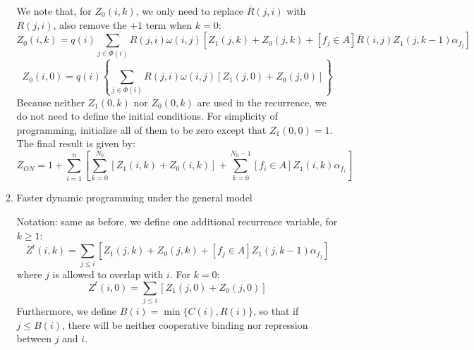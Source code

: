 \documentclass[11pt]{article}
\begin{document}
\begin{enumerate}
\begin{enumerate}
We note that, for $Z_0(i,k)$, we only need to replace $\bar{R}(j,i)$ with $R(j,i)$, also remove the $+1$ term when $k = 0$: 
\begin{equation}
Z_0(i,k) = q(i) \sum_{j \in \Phi(i)} {R}(j,i) \omega(i,j) \left[ Z_1(j,k) + Z_0(j,k) + [f_j \in A] \bar{R}(i,j) Z_1(j,k-1) \alpha_{f_j} \right]
\end{equation}
\begin{equation}
Z_0(i,0) = q(i) \left\{ \sum_{j \in \Phi(i)} {R}(j,i) \omega(i,j) \left[ Z_1(j,0) + Z_0(j,0) \right] \right\}
\end{equation}
Because neither $Z_1(0,k)$ nor $Z_0(0,k)$ are used in the recurrence, we do not need to define the initial conditions. For simplicity of programming, initialize all of them to be zero except that $Z_1(0,0) = 1$. The final result is given by: 
\begin{equation}
Z_{ON} = 1 + \sum_{i = 1}^{n} \left[ \sum_{k=0}^{N_0} [Z_1(i,k) + Z_0(i,k)] + \sum_{k=0}^{N_0-1} [f_i \in A] Z_1(i,k) \alpha_{f_i} \right]
\end{equation}

\item{Faster dynamic programming under the general model}

Notation: same as before, we define one additional recurrence variable, for $k \geq 1$: 
\begin{equation}
Z^t(i,k) = \sum_{j \leq i} \left[ Z_1(j,k) + Z_0(j,k) + [f_j \in A] Z_1(j, k-1) \alpha_{f_j}\right]
\end{equation}
where $j$ is allowed to overlap with $i$. For $k = 0$: 
\begin{equation}
Z^t(i,0) = \sum_{j \leq i} \left[ Z_1(j,0) + Z_0(j,0)\right]
\end{equation}
Furthermore, we define $B(i) = \min \{C(i),R(i)\}$, so that if $j \leq B(i)$, there will be neither cooperative binding nor repression between $j$ and $i$.


\end{enumerate}
\end{enumerate}
\end{document}
